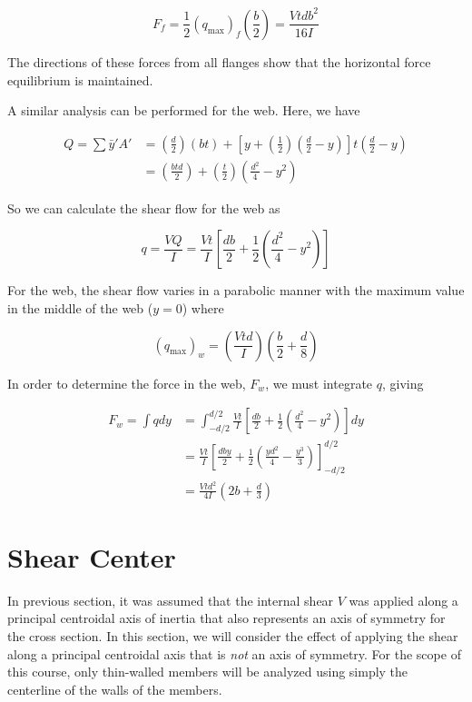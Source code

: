\documentclass[
10pt,
a4paper,
openany,
svgnames,
]{book} %
\begin{document}
\[F_f = \frac{1}{2}(q_{\max })_f\left( \frac{b}{2} \right) = \frac{Vtdb^2}{16I}\]

The directions of these forces from all flanges show that the horizontal force equilibrium is maintained.

A similar analysis can be performed for the web. Here, we have

\begin{align*}
  Q = \sum \bar y'A'  &= \left( \frac{d}{2} \right)(bt) + \left[ y + \left( \frac{1}{2} \right)\left( \frac{d}{2} - y \right) \right]t\left( \frac{d}{2} - y \right) \\ 
                        &= \left( \frac{btd}{2} \right) + \left( \frac{t}{2} \right)\left( \frac{d^2}{4} - y^2 \right)
\end{align*}	

So we can calculate the shear flow for the web as

\begin{equation}
  q = \frac{VQ}{I} = \frac{Vt}{I}\left[ \frac{{db}}{2} + \frac{1}{2}\left( {\frac{d^2}{4} - y^2} \right) \right]
\end{equation}

For the web, the shear flow varies in a parabolic manner with the maximum value in the middle of the web ($y = 0$) where

\[(q_{\max })_w = \left( \frac{Vtd}{I} \right)\left( \frac{b}{2} + \frac{d}{8} \right)\]	

In order to determine the force in the web, $F_w$, we must integrate $q$, giving

\begin{align}
  {F_w} = \int {qdy}  &= \int_{ - d/2}^{d/2} {\frac{{Vt}}{I}\left[ {\frac{{db}}{2} + \frac{1}{2}\left( {\frac{{{d^2}}}{4} - {y^2}} \right)} \right]dy} \nonumber \\ 
   &= \frac{Vt}{I}\left[ \frac{dby}{2} + \frac{1}{2}\left( \frac{yd^2}{4} - \frac{y^3}{3} \right) \right]_{-d/2}^{d/2} \nonumber \\ 
   &= \frac{Vtd^2}{4I}\left( 2b + \frac{d}{3} \right)
\end{align}

\section{Shear Center}

In previous section, it was assumed that the internal shear $V$ was applied along a principal centroidal axis of inertia that also represents an axis of symmetry for the cross section. In this section, we will consider the effect of applying the shear along a principal centroidal axis that is \emph{not} an axis of symmetry. For the scope of this course, only thin-walled members will be analyzed using simply the centerline of the walls of the members.
\end{document}
